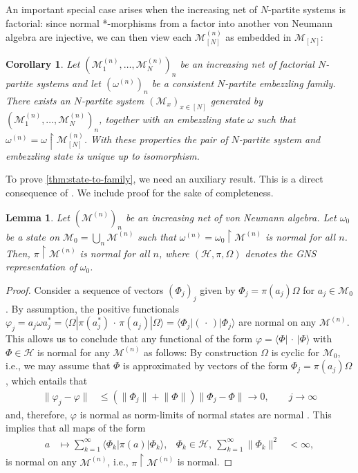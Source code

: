 \documentclass[a4paper, 10pt, onecolumn, accepted=2025-07-22]{quantumarticle}
\newtheorem{lemma}[theorem]{Lemma}
\newtheorem{corollary}[theorem]{Corollary}
\theoremstyle{definition}
\newcommand{\ket}[1]{|#1\rangle}
\newcommand{\bra}[1]{\langle#1|}
\newcommand{\norm}[1]{\lVert #1\rVert}
\newcommand{\mc}{\mathcal}
\newcommand{\up}[1]{^{(#1)}}
\def\H{{\mc H}}
\def\M{{\mc M}}
\newcommand*{\1}{\text{\usefont{U}{bbold}{m}{n}1}}
\newcommand{\placeholder}[0]{{\,\cdot\,}}
\begin{document}
An important special case arises when the increasing net of $N$-partite systems is factorial: since normal *-morphisms from a  factor into another von Neumann algebra are injective, we can then view each $\M^{(n)}_{[N]}$ as embedded in $\M_{[N]}$:
\begin{corollary}\label{cor:consistent-to-state-factorial}
    Let $(\M^{(n)}_1,\ldots,\M^{(n)}_N)_{n}$ be an increasing net of factorial $N$-partite systems and let $(\omega^{(n)})_{n}$ be a consistent $N$-partite embezzling family. There exists an $N$-partite system $(\M_x)_{x\in[N]}$ generated by  $(\M^{(n)}_1,\ldots,\M^{(n)}_N)_{n}$, together with an embezzling state $\omega$ such that $\omega^{(n)} =\omega\restriction \M^{(n)}_{[N]}$. With these properties the pair of $N$-partite system and embezzling state is unique up to isomorphism. 
\end{corollary}

To prove \cref{thm:state-to-family}, we need an auxiliary result. This is a direct consequence of \cite[Thm.~IV.9.5]{glimm1985qft_expositions}. We include proof for the sake of completeness.

\begin{lemma}\label{lem:local_normal}
Let $(\M^{(n)})_{n}$ be an increasing net of von Neumann algebra. Let $\omega_0$ be a state on $\M_{0} = \bigcup_{n}\M\up{n}$ such that $\omega^{(n)}=\omega_0\restriction\M\up{n}$ is normal for all $n$. Then, $\pi\restriction\M\up{n}$ is normal for all $n$, where $(\H,\pi,\Omega)$ denotes the GNS representation of $\omega_0$.
\end{lemma}
\begin{proof}
Consider a sequence of vectors $(\Phi_{j})_{j}$ given by $\Phi_{j} = \pi(a_{j})\Omega$ for $a_{j}\in\M_0$. 
By assumption, the positive functionals $\varphi_{j} = a_j\omega a_j^* = \bra\Omega\pi(a_{j}^{*})\placeholder\pi(a_{j})\ket{\Omega} = \bra{\Phi_{j}}(\placeholder)\ket{\Phi_{j}}$ are normal on any $\M^{(n)}$.
This allows us to conclude that any functional of the form $\varphi = \bra{\Phi}\placeholder\ket{\Phi}$ with $\Phi\in\H$ is normal for any $\M^{(n)}$ as follows: By construction $\Omega$ is cyclic for $\M_0$, i.e., we may assume that $\Phi$ is approximated by vectors of the form $\Phi_{j} = \pi(a_{j})\Omega$, which entails that
\begin{align*}
   \norm{\varphi_{j} - \varphi} & \leq (\norm{\Phi_{j}}+\norm{\Phi})\norm{\Phi_{j}-\Phi} \to 0, \qquad j \to \infty
\end{align*}
and, therefore, $\varphi$ is normal as norm-limits of normal states are normal \cite[Lem.~III.3.14]{takesaki1}. This implies that all maps of the form
\begin{align*}
   a & \mapsto \sum_{k=1}^{\infty}\bra{\Phi_{k}}\pi(a)\ket{\Phi_{k}}, & \Phi_{k}\in\H,\ \sum_{k=1}^{\infty}\norm{\Phi_{k}}^{2} & < \infty,
\end{align*}
is normal on any $\M^{(n)}$, i.e., $\pi\restriction\M^{(n)}$ is normal.
\end{proof}
\end{document}
